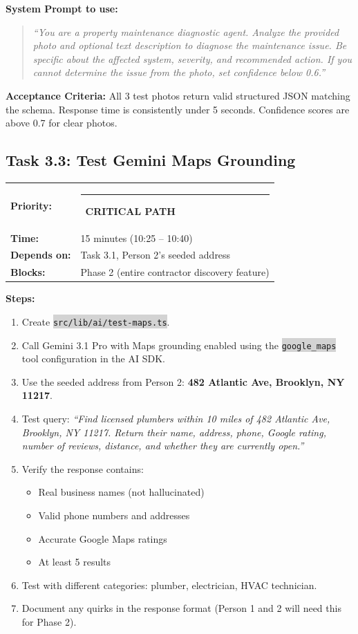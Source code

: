 \documentclass[11pt, a4paper]{article}
\newcommand{\critical}{\textcolor{critred}{\rule{6pt}{6pt}}~\textcolor{critred}{\scriptsize\textbf{CRITICAL PATH}}}
\newcommand{\code}[1]{\texttt{\small\colorbox{lightgray}{#1}}}
\begin{document}
\textbf{System Prompt to use:}
\begin{quote}
\textit{``You are a property maintenance diagnostic agent. Analyze the provided photo and optional text description to diagnose the maintenance issue. Be specific about the affected system, severity, and recommended action. If you cannot determine the issue from the photo, set confidence below 0.6.''}
\end{quote}

\textbf{Acceptance Criteria:} All 3 test photos return valid structured JSON matching the schema. Response time is consistently under 5 seconds. Confidence scores are above 0.7 for clear photos.

\vspace{1em}

\subsection{Task 3.3: Test Gemini Maps Grounding}

\begin{tabularx}{\textwidth}{lX}
\textbf{Priority:} & \critical \\
\textbf{Time:} & 15 minutes (10:25 -- 10:40) \\
\textbf{Depends on:} & Task 3.1, Person 2's seeded address \\
\textbf{Blocks:} & Phase 2 (entire contractor discovery feature) \\
\end{tabularx}

\vspace{0.3em}

\textbf{Steps:}
\begin{enumerate}[leftmargin=2em, itemsep=2pt]
  \item Create \code{src/lib/ai/test-maps.ts}.
  \item Call Gemini 3.1 Pro with Maps grounding enabled using the \code{google\_maps} tool configuration in the AI SDK.
  \item Use the seeded address from Person 2: \textbf{482 Atlantic Ave, Brooklyn, NY 11217}.
  \item Test query: \textit{``Find licensed plumbers within 10 miles of 482 Atlantic Ave, Brooklyn, NY 11217. Return their name, address, phone, Google rating, number of reviews, distance, and whether they are currently open.''}
  \item Verify the response contains:
    \begin{itemize}[itemsep=1pt]
      \item Real business names (not hallucinated)
      \item Valid phone numbers and addresses
      \item Accurate Google Maps ratings
      \item At least 5 results
    \end{itemize}
  \item Test with different categories: plumber, electrician, HVAC technician.
  \item Document any quirks in the response format (Person 1 and 2 will need this for Phase 2).
\end{enumerate}
\end{document}
